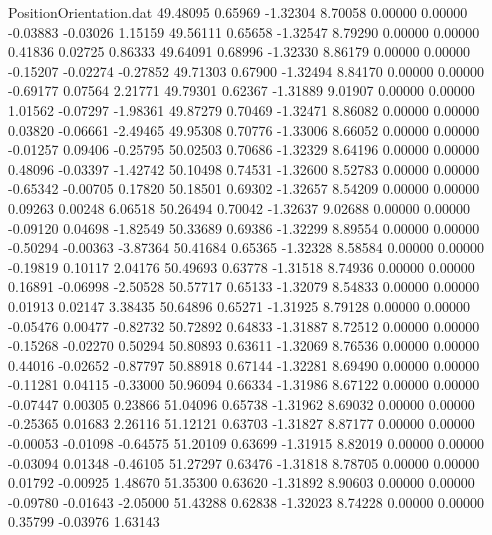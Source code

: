 \begin{filecontents}{PositionOrientation.dat}
  49.48095    0.65969   -1.32304     8.70058    0.00000    0.00000   -0.03883   -0.03026    1.15159
  49.56111    0.65658   -1.32547     8.79290    0.00000    0.00000    0.41836    0.02725    0.86333
  49.64091    0.68996   -1.32330     8.86179    0.00000    0.00000   -0.15207   -0.02274   -0.27852
  49.71303    0.67900   -1.32494     8.84170    0.00000    0.00000   -0.69177    0.07564    2.21771
  49.79301    0.62367   -1.31889     9.01907    0.00000    0.00000    1.01562   -0.07297   -1.98361
  49.87279    0.70469   -1.32471     8.86082    0.00000    0.00000    0.03820   -0.06661   -2.49465
  49.95308    0.70776   -1.33006     8.66052    0.00000    0.00000   -0.01257    0.09406   -0.25795
  50.02503    0.70686   -1.32329     8.64196    0.00000    0.00000    0.48096   -0.03397   -1.42742
  50.10498    0.74531   -1.32600     8.52783    0.00000    0.00000   -0.65342   -0.00705    0.17820
  50.18501    0.69302   -1.32657     8.54209    0.00000    0.00000    0.09263    0.00248    6.06518
  50.26494    0.70042   -1.32637     9.02688    0.00000    0.00000   -0.09120    0.04698   -1.82549
  50.33689    0.69386   -1.32299     8.89554    0.00000    0.00000   -0.50294   -0.00363   -3.87364
  50.41684    0.65365   -1.32328     8.58584    0.00000    0.00000   -0.19819    0.10117    2.04176
  50.49693    0.63778   -1.31518     8.74936    0.00000    0.00000    0.16891   -0.06998   -2.50528
  50.57717    0.65133   -1.32079     8.54833    0.00000    0.00000    0.01913    0.02147    3.38435
  50.64896    0.65271   -1.31925     8.79128    0.00000    0.00000   -0.05476    0.00477   -0.82732
  50.72892    0.64833   -1.31887     8.72512    0.00000    0.00000   -0.15268   -0.02270    0.50294
  50.80893    0.63611   -1.32069     8.76536    0.00000    0.00000    0.44016   -0.02652   -0.87797
  50.88918    0.67144   -1.32281     8.69490    0.00000    0.00000   -0.11281    0.04115   -0.33000
  50.96094    0.66334   -1.31986     8.67122    0.00000    0.00000   -0.07447    0.00305    0.23866
  51.04096    0.65738   -1.31962     8.69032    0.00000    0.00000   -0.25365    0.01683    2.26116
  51.12121    0.63703   -1.31827     8.87177    0.00000    0.00000   -0.00053   -0.01098   -0.64575
  51.20109    0.63699   -1.31915     8.82019    0.00000    0.00000   -0.03094    0.01348   -0.46105
  51.27297    0.63476   -1.31818     8.78705    0.00000    0.00000    0.01792   -0.00925    1.48670
  51.35300    0.63620   -1.31892     8.90603    0.00000    0.00000   -0.09780   -0.01643   -2.05000
  51.43288    0.62838   -1.32023     8.74228    0.00000    0.00000    0.35799   -0.03976    1.63143

\end{filecontents}
